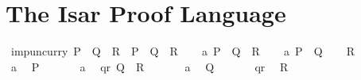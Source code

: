 \section{The Isar Proof Language}
\label{sec:isar-proof-language}


\begin{isabellebody}
\isanewline
\isamarkupfalse%
\ imp{\isacharunderscore}uncurry{}{\isacharcolon}\ {\isachardoublequote}P\ {\isasymlongrightarrow}\ {\isacharparenleft}Q\ {\isasymlongrightarrow}\ R{\isacharparenright}\ {\isasymLongrightarrow}\ {\isacharparenleft}P\ {\isasymand}\ Q{\isacharparenright}\ {\isasymlongrightarrow}\ R{\isachardoublequote}\isanewline
\isamarkupfalse%
\isanewline
\ \ \isamarkupfalse%
\ a{}{\isacharcolon}\ {\isachardoublequote}P\ {\isasymlongrightarrow}\ Q\ {\isasymlongrightarrow}\ R{\isachardoublequote}\isanewline
\ \ \isamarkupfalse%
\ a{}{\isacharcolon}\ {\isachardoublequote}P\ {\isasymand}\ Q{\isachardoublequote}\isanewline
\ \ \isamarkupfalse%
\ {\isachardoublequote}R{\isachardoublequote}\isanewline
\ \ \isamarkupfalse%
\ {\isacharminus}\isanewline
\ \ \ \ \isamarkupfalse%
\ a{}\ \isamarkupfalse%
\ P\ \isamarkupfalse%
\isacommand{{\isachardot}{\isachardot}}\isanewline
\ \ \ \ \isamarkupfalse%
\ a{}\ \isamarkupfalse%
\ qr{\isacharcolon}\ {\isachardoublequote}Q\ {\isasymlongrightarrow}\ R{\isachardoublequote}\ \isamarkupfalse%
\isacommand{{\isachardot}{\isachardot}}\isanewline
\ \ \ \ \isamarkupfalse%
\ a{}\ \isamarkupfalse%
\ Q\ \isamarkupfalse%
\isacommand{{\isachardot}{\isachardot}}\isanewline
\ \ \ \ \isamarkupfalse%
\ qr\ \isamarkupfalse%
\ {\isachardoublequote}R{\isachardoublequote}\ \isamarkupfalse%
\isacommand{{\isachardot}{\isachardot}}\isanewline
\ \ \isamarkupfalse%
\isanewline
\isamarkupfalse%
\isanewline
\isanewline
\isanewline
\isamarkupfalse%
\isanewline
\isamarkupfalse%
\end{isabellebody}%



